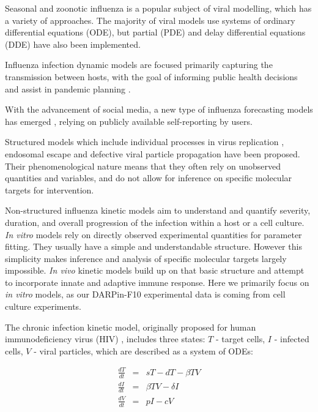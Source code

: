 Seasonal and zoonotic influenza is a popular subject of viral modelling, which has a variety of approaches. The majority of viral models use systems of ordinary differential equations (ODE), but partial (PDE) and delay differential equations (DDE) have also been implemented.

Influenza infection dynamic models are focused primarily capturing the transmission between hosts, with the goal of informing public health decisions and assist in pandemic planning \cite{ferguson2006strategies, mcvernon2007model}.

With the advancement of social media, a new type of influenza forecasting models has emerged \cite{pawelek2014modeling, santillana2015combining, levy2018modeling}, relying on publicly available self-reporting by users.

Structured models which include individual processes in virus replication \cite{sidorenko2004structured}, endosomal escape \cite{lagache2012modeling} and defective viral particle propagation \cite{rudiger2019multiscale} have been proposed. Their phenomenological nature means that they often rely on unobserved quantities and variables, and do not allow for inference on specific molecular targets for intervention.

Non-structured influenza kinetic models aim to understand and quantify severity, duration, and overall progression of the infection within a host or a cell culture. \textit{In vitro} models rely on directly observed experimental quantities for parameter fitting. They usually have a simple and understandable structure. However this simplicity makes inference and analysis of specific molecular targets largely impossible. \textit{In vivo} kinetic models build up on that basic structure and attempt to incorporate innate \cite{beauchemin2008modeling, handel2010towards,miao2010quantifying} and adaptive \cite{belz2002compromised, handel2010towards, miao2010quantifying} immune response. Here we primarily focus on \textit{in vitro} models, as our DARPin-F10 experimental data is coming from cell culture experiments.

The chronic infection kinetic model, originally proposed for human immunodeficiency virus (HIV) \cite{perelson2002modelling}, includes three states: $T$ - target cells, $I$ - infected cells, $V$ - viral particles, which are described as a system of ODEs:

\begin{equation}
\begin{array}{rcl}
\frac{dT}{dt} &=& s T - d T - \beta T V \\
\frac{dI}{dt} &=& \beta T V - \delta I \\
\frac{dV}{dt} &=& p I - c V
\end{array}
\end{equation}

